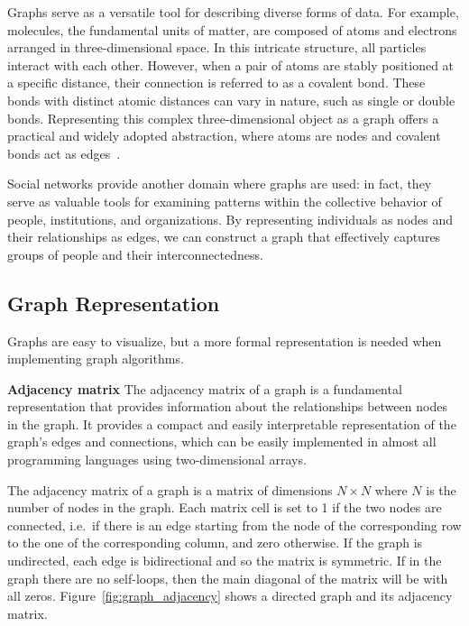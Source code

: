 Graphs serve as a versatile tool for describing diverse forms of data.
For example, molecules, the fundamental units of matter, are composed of atoms and electrons arranged in three-dimensional space.
In this intricate structure, all particles interact with each other.
However, when a pair of atoms are stably positioned at a specific distance, their connection is referred to as a covalent bond.
These bonds with distinct atomic distances can vary in nature, such as single or double bonds.
Representing this complex three-dimensional object as a graph offers a practical and widely adopted abstraction, where atoms are nodes and covalent bonds act as edges~\cite{DBLP:journals/corr/DuvenaudMAGHAA15}.

Social networks provide another domain where graphs are used: in fact, they serve as valuable tools for examining patterns within the collective behavior of people, institutions, and organizations.
By representing individuals as nodes and their relationships as edges, we can construct a graph that effectively captures groups of people and their interconnectedness.

\subsection{Graph Representation}
\label{subsec:graph_representation}

Graphs are easy to visualize, but a more formal representation is needed when implementing graph algorithms.

\textbf{Adjacency matrix} \newline
The adjacency matrix of a graph is a fundamental representation that provides information about the relationships between nodes in the graph.
It provides a compact and easily interpretable representation of the graph's edges and connections, which can be easily implemented in almost all programming languages using two-dimensional arrays.

The adjacency matrix of a graph is a matrix of dimensions $N \times N$ where $N$ is the number of nodes in the graph.
Each matrix cell is set to 1 if the two nodes are connected, i.e.\ if there is an edge starting from the node of the corresponding row to the one of the corresponding column, and zero otherwise.
If the graph is undirected, each edge is bidirectional and so the matrix is symmetric.
If in the graph there are no self-loops, then the main diagonal of the matrix will be with all zeros.
Figure~\ref{fig:graph_adjacency} shows a directed graph and its adjacency matrix.

